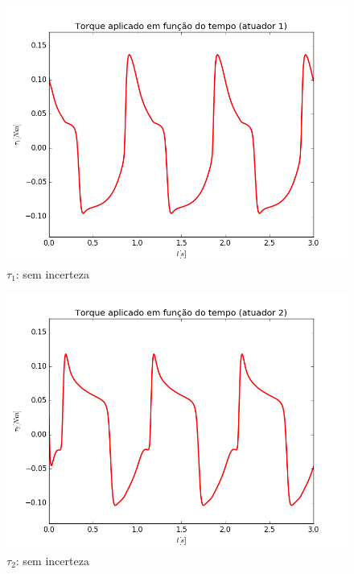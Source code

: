 \documentclass[]{politex}
\begin{document}
\begin{multicols}{2}
\begin{figure}[H]
	\centering
	\includegraphics[scale=0.42]{imagens/0/tau1.png}  
	\caption{$\tau_1$: sem incerteza}
	\label{fig:Torque1_0}
\end{figure}
\begin{figure}[H]
	\centering
	\includegraphics[scale=0.42]{imagens/0/tau2.png}  
	\caption{$\tau_2$: sem incerteza}
	\label{fig:Torque2_0}
\end{figure}
\end{multicols}
\end{document}
